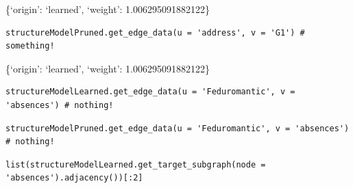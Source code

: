\documentclass[
]{article}
\begin{document}
\{`origin': `learned', `weight': 1.006295091882122\}

\begin{verbatim}
structureModelPruned.get_edge_data(u = 'address', v = 'G1') # something!
\end{verbatim}

\{`origin': `learned', `weight': 1.006295091882122\}

\begin{verbatim}
structureModelLearned.get_edge_data(u = 'Feduromantic', v = 'absences') # nothing!
\end{verbatim}

\begin{verbatim}
structureModelPruned.get_edge_data(u = 'Feduromantic', v = 'absences') # nothing!
\end{verbatim}

\begin{verbatim}
list(structureModelLearned.get_target_subgraph(node = 'absences').adjacency())[:2]
\end{verbatim}
\end{document}
